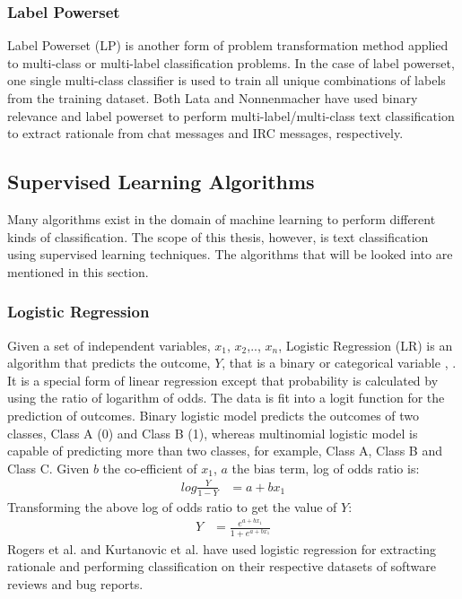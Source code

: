 \documentclass[a4paper,12pt,twoside]{report}
\begin{document}
\subsubsection{Label Powerset} 
Label Powerset (\acs{LP}) is another form of problem transformation method applied to multi-class or multi-label classification problems. In the case of label powerset, one single multi-class classifier is used to train all unique combinations of labels from the training dataset.
\newline \newline
Both Lata \cite{Lata2016} and Nonnenmacher\cite{Nonnenmacher2017} have used binary relevance and label powerset to perform multi-label/multi-class text classification to extract rationale from chat messages and \acs{IRC} messages, respectively. 

\subsection{Supervised Learning Algorithms}
Many algorithms exist in the domain of machine learning to perform different kinds of classification. The scope of this thesis, however, is text classification using supervised learning techniques. The algorithms that will be looked into are mentioned in this section.

\subsubsection{Logistic Regression}
Given a set of independent variables, $x_1$, $x_2$,.., $x_n$, Logistic Regression (\acs{LR}) is an algorithm that predicts the outcome, $Y$, that is a binary or categorical variable \cite{Peng2002}, \cite{Strombergsson2009} . It is a special form of linear regression except that probability is calculated by using the ratio of logarithm of odds. The data is fit into a logit function for the prediction of outcomes. Binary logistic model predicts the outcomes of two classes, Class A (0) and Class B (1), whereas multinomial logistic model is capable of predicting more than two classes, for example, Class A, Class B and Class C\cite{Jurafsky2017}. 
\newline \newline
Given $b$ the co-efficient of $x_1$, $a$ the bias term, log of odds ratio is:
\begin{align*}
log\frac{Y}{1-Y} &= a + bx_1
\end{align*}
\newline 
Transforming the above log of odds ratio to get the value of $Y$:
\begin{align*}
Y &=  \frac{e^{a + bx_1}}{1 + e^{a + bx_1}}
\end{align*}
\newline 
Rogers et al.\cite{Rogers2012} and Kurtanovic et al.\cite{Kurtanovic2017} have used logistic regression for extracting rationale and performing classification on their respective datasets of software reviews and bug reports. 
\end{document}
